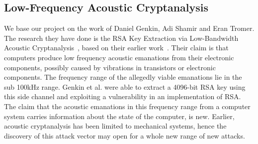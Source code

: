 \subsection{Low-Frequency Acoustic Cryptanalysis}\label{chp2:subsec:original_research}
We base our project on the work of Daniel Genkin, Adi Shamir and Eran Tromer.
The research they have done is the RSA Key Extraction via Low-Bandwidth Acoustic Cryptanalysis~\cite{DBLP:conf/crypto/GenkinST14}, based on their earlier work~\cite{tromer2004acoustic, tromer2007hardware}.
Their claim is that computers produce low frequency acoustic emanations from their electronic components, possibly caused by vibrations in transistors or electronic components.
The frequency range of the allegedly viable emanations lie in the sub 100kHz range.
Genkin et al. were able to extract a 4096-bit RSA key using this side channel and exploiting a vulnerability in an implementation of RSA.
The claim that the acoustic emanations in this frequency range from a computer system carries information about the state of the computer, is new.
Earlier, acoustic cryptanalysis has been limited to mechanical systems, hence the discovery of this attack vector may open for a whole new range of new attacks.
